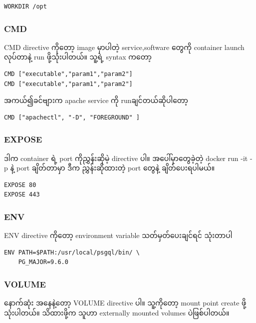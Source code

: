 \documentclass{article}
\begin{document}
\begin{verbatim}
WORKDIR /opt
\end{verbatim}

\subsubsection{CMD}\label{cmd}

CMD directive ကို​တော့ image မှာပါတဲ့ service,software ​တွေကို container
launch လုပ်​​တာနဲ့ run ဖို့သုံးပါတယ်။​ သူ့ရဲ့ syntax က​တော့

\begin{verbatim}
CMD ["executable","param1","param2"]
CMD ["executable","param1","param2"]
\end{verbatim}

အကယ်​၍ခင်​​ဗျားက apache service ကို runချင်​တယ်​ဆိုပါ​တော့

\begin{verbatim}
CMD ["apachectl", "-D", "FOREGROUND" ]
\end{verbatim}

\subsubsection{EXPOSE}\label{expose}

ဒါက container ရဲ့ port ကိုညွှန်းဆိုမဲ့ directive ပါ။ အ​ပေါ်မှာ​တွေခဲ့တဲ့
docker run -it -p နဲ့ port ချိတ်​တာမှာ ဒီက ညွှန်းဆိုထားတဲ့ port ​တွေနဲ့
ချိတ်​​ပေးရပါမယ်​။

\begin{verbatim}
EXPOSE 80
EXPOSE 443
\end{verbatim}

\subsubsection{ENV}\label{env}

ENV directive ကို​တော့ environment variable သတ်​မှတ်​​ပေးချင်​ရင်​
သုံးတာပါ

\begin{verbatim}
ENV PATH=$PATH:/usr/local/psgql/bin/ \
    PG_MAJOR=9.6.0
\end{verbatim}

\subsubsection{VOLUME}\label{volume}

​နောက်​ဆုံး အ​နေနဲ့​တော့ VOLUME directive ပါ။ သူ့ကို​တော့ mount point
create ဖို့ သုံးပါတယ်​။ သိထားဖို့က သူဟာ externally mounted volumes
ပဲဖြစ်​ပါတယ်​။
\end{document}
